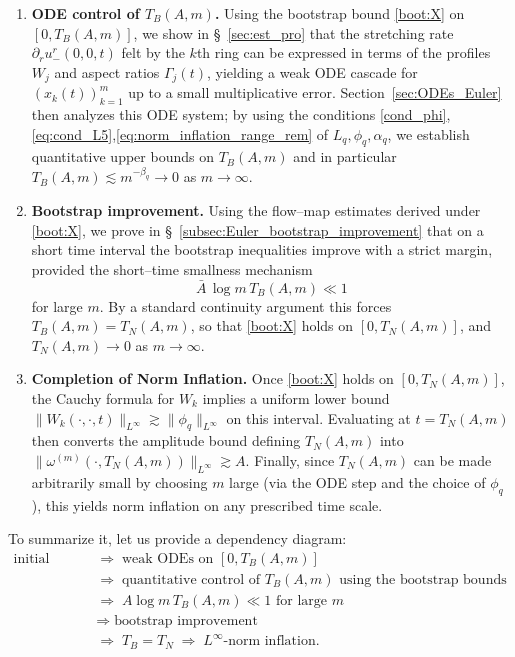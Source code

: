 \documentclass[reqno,11pt]{amsart}
\begin{document}
\begin{enumerate}
\item \textbf{ODE control of $T_B(A, m)$.}
Using the bootstrap bound \eqref{boot:X} on $[0,T_B(A,m)]$, we show in \S~\ref{sec:est_pro} that the stretching rate
$\partial_r u^r_-(0,0,t)$ felt by the $k$th ring can be expressed in terms of the profiles $W_j$
and aspect ratios $\Gamma_j(t)$, yielding a weak ODE cascade  for
$(x_k(t))_{k=1}^m$ up to a small multiplicative error.
Section~\ref{sec:ODEs_Euler} then analyzes this ODE system; by using the conditions \eqref{cond_phi},\eqref{eq:cond_L5},\eqref{eq:norm_inflation_range_rem} of $L_q, \phi_q,\alpha_q$, we establish
quantitative upper bounds on $T_B(A,m)$ and in particular $T_B(A,m)\lesssim  m^{-\beta_q}\to0$ as $m\to\infty$.

\item \textbf{Bootstrap improvement.}
Using the flow--map estimates derived under \eqref{boot:X}, we prove in
\S~\ref{subsec:Euler_bootstrap_improvement} that on a short time interval the bootstrap inequalities improve with a strict margin,
provided the short--time smallness mechanism
\[
\bar A\,\log m \, T_B(A,m)\ll1
\]
for large $m$. 
By a standard continuity argument this forces $T_B(A,m)=T_N(A,m)$, so that
\eqref{boot:X} holds on $[0,T_N(A,m)]$, and $T_N(A,m)\to 0$ as $m\to\infty$.

\item \textbf{Completion of Norm Inflation.}
Once \eqref{boot:X} holds on $[0,T_N(A,m)]$, the Cauchy formula for $W_k$ implies a uniform
lower bound $\|W_k(\cdot,\cdot,t)\|_{L^\infty}\gtrsim \|\phi_q\|_{L^\infty}$ on this interval.
Evaluating at $t=T_N(A,m)$ then converts the amplitude bound defining $T_N(A,m)$ into
$\|\omega^{(m)}(\cdot,T_N(A,m))\|_{L^\infty}\gtrsim A$.
Finally, since $T_N(A,m)$ can be made arbitrarily small by choosing $m$ large (via the ODE step
and the choice of $\phi_{q}$), this yields norm inflation on any prescribed time scale.
\end{enumerate}

To summarize it, let us provide a dependency diagram:
\begin{equation*}
\begin{aligned}
\text{initial data}
&\;\Longrightarrow\;
\text{weak ODEs on } [0,T_B(A,m)] \\
&\;\Longrightarrow\;
\text{quantitative control of } T_B(A,m) \text{ using the bootstrap bounds}\\
&\;\Longrightarrow\;
A \log m\, T_B(A,m) \ll 1 \text{ for large }m\\
&\;\Longrightarrow\;
\text{bootstrap improvement} \\
&\;\Longrightarrow\;
T_B = T_N
\;\Longrightarrow\;
L^\infty\text{-norm inflation}.
\end{aligned}
\end{equation*}
\end{document}
